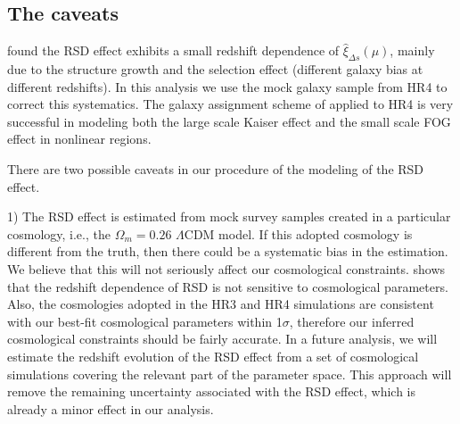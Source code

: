 \documentclass[iop]{emulateapj}
\begin{document}


\subsection{The caveats}\label{sec:caveats}

\cite{Li2014,Li2015} found the RSD effect exhibits a small redshift dependence of $\hat \xi_{\Delta s}(\mu)$, 
mainly due to the structure growth and the selection effect
(different galaxy bias at different redshifts).
In this analysis we use the mock galaxy sample from HR4 to correct this systematics.
The galaxy assignment scheme of \cite{hong2016} applied to HR4 is very successful in modeling both the 
large scale Kaiser effect and the small scale FOG effect in nonlinear regions.

There are two possible caveats in our procedure of the modeling of the RSD effect.

1) The RSD effect is estimated from mock survey samples created in a particular cosmology, 
i.e., the $\Omega_m=0.26$ $\Lambda$CDM model. %
If this adopted cosmology is different from the truth, then there could be a systematic bias in the estimation. %
We believe that this will not seriously affect our cosmological constraints.
\cite{Li2014} shows that the redshift dependence of RSD is not sensitive to cosmological parameters.
Also, the cosmologies adopted in the HR3 and HR4 simulations are consistent with our best-fit cosmological parameters within 1$\sigma$,
therefore our inferred cosmological constraints should be fairly accurate.
In a future analysis,
we will estimate the redshift evolution of the RSD effect from a set of cosmological simulations 
covering the relevant part of the parameter space.
This approach will remove the remaining uncertainty associated with the RSD effect, 
which is already a minor effect in our analysis.
\end{document}
